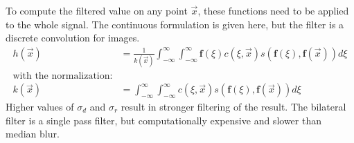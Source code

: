 To compute the filtered value on any point $\vec{x}$, these functions need to be applied to the whole signal.
The continuous formulation is given here, but the filter is a discrete convolution for images.
\begin{equation}
\begin{aligned}
    h(\vec{x}) &= \frac{1}{k(\vec{x})} \int_{-\infty}^{\infty} \int_{-\infty}^{\infty} \mathbf{f}(\xi) c(\xi, \vec{x}) s(\mathbf{f}(\xi), \mathbf{f}(\vec{x})) d\xi \\
    \text{with the normalization:} \\
    k(\vec{x}) &= \int_{-\infty}^{\infty} \int_{-\infty}^{\infty} c(\xi, \vec{x}) s(\mathbf{f}(\xi), \mathbf{f}(\vec{x})) d\xi
\end{aligned}
\end{equation}
Higher values of $\sigma_d$ and $\sigma_r$ result in stronger filtering of the result.
The bilateral filter is a single pass filter, but computationally expensive and slower than median blur.
